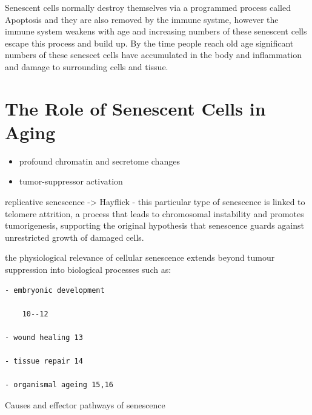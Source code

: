\documentclass[
]{book}
\begin{document}
Senescent cells normally destroy themselves via a programmed process called Apoptosis and they are also removed by the immune systme, however the immune system weakens with age and increasing numbers of these senescent cells escape this process and build up. By the time people reach old age significant numbers of these senescet cells have accumulated in the body and inflammation and damage to surrounding cells and tissue.

\hypertarget{the-role-of-senescent-cells-in-aging}{%
\section{The Role of Senescent Cells in Aging}\label{the-role-of-senescent-cells-in-aging}}

\begin{itemize}
\item
  profound chromatin and secretome changes
\item
  tumor-suppressor activation
\end{itemize}

replicative senescence -\textgreater{} Hayflick - this particular type of senescence is linked to telomere attrition, a process that leads to chromosomal instability and promotes tumorigenesis, supporting the original hypothesis that senescence guards against unrestricted growth of damaged cells.

the physiological relevance of cellular senescence extends beyond tumour suppression into biological processes such as:

\begin{verbatim}
- embryonic development

    10--12

- wound healing 13

- tissue repair 14

- organismal ageing 15,16
\end{verbatim}

Causes and effector pathways of senescence
\end{document}
